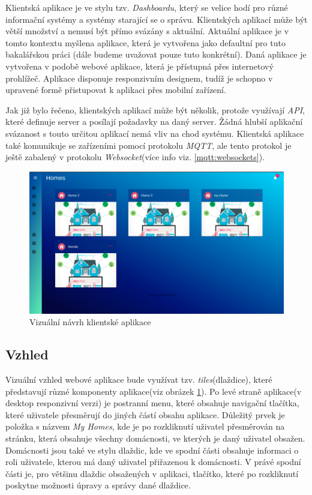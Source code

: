 Klientská aplikace je ve stylu tzv. \emph{Dashboardu}, který se velice hodí pro různé informační systémy a systémy starající se o správu.
Klientských aplikací může být větší množství a nemusí být přímo svázány s aktuální.
Aktuální aplikace je v tomto kontextu myšlena aplikace, která je vytvořena jako defaultní pro tuto bakalářskou práci (dále budeme uvažovat pouze tuto konkrétní).
Daná aplikace je vytvořena v podobě webové aplikace, která je přístupná přes internetový prohlížeč.
Aplikace disponuje responzivním designem, tudíž je schopno v upravené formě přistupovat k aplikaci přes mobilní zařízení.

Jak již bylo řečeno, klientských aplikací může být několik, protože využívají \emph{API}, které definuje server a posílají požadavky na daný server.
Žádná hlubší aplikační svázanost s touto určitou aplikací nemá vliv na chod systému.
Klientská aplikace také komunikuje se zařízeními pomocí protokolu \emph{MQTT}, ale tento protokol je ještě zabalený v protokolu \emph{Websocket}(více info viz. \ref{mqtt:websockets}).

\begin{figure}[hbt]
  \centering
  \includegraphics[width=0.9 \linewidth]{obrazky-figures/mockup.png}
  \caption{Vizuální návrh klientské aplikace}
  \label{figure:design}
\end{figure}

\newpage
\subsection*{Vzhled}
\label{frontend:vzhled}
Vizuální vzhled webové aplikace bude využívat tzv. \emph{tiles}(dlaždice), které představují různé komponenty aplikace(viz obrázek \ref{figure:design}).
Po levé straně aplikace(v desktop responzivní verzi) je postranní menu, které obsahuje navigační tlačítka, které uživatele přesměrují do jiných částí obsahu aplikace.
Důležitý prvek je položka s názvem \emph{My Homes}, kde je po rozkliknutí uživatel přesměrován na stránku, která obsahuje všechny domácnosti, ve kterých je daný uživatel obsažen.
Domácnosti jsou také ve stylu dlaždic, kde ve spodní části obsahuje informaci o roli uživatele, kterou má daný uživatel přiřazenou k domácnosti.
V právé spodní části je, pro většinu dlaždic obsažených v aplikaci, tlačítko, které po rozkliknutí poskytne možnosti úpravy a správy dané dlaždice.

